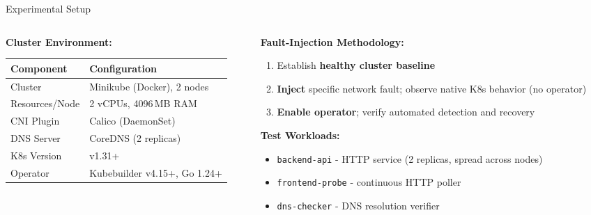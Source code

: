 \documentclass[aspectratio=169, 11pt]{beamer}
\begin{document}
\begin{frame}{Experimental Setup}

\begin{columns}[T]
\begin{column}{0.45\textwidth}
\footnotesize
\textbf{Cluster Environment:}
\vspace{4pt}
\renewcommand{\arraystretch}{1.15}
\setlength{\tabcolsep}{4pt}
\begin{tabular}{@{}l l@{}}
\toprule
\textbf{Component} & \textbf{Configuration} \\
\midrule
Cluster & Minikube (Docker), 2 nodes \\
Resources/Node & 2 vCPUs, 4096\,MB RAM \\
CNI Plugin & Calico (DaemonSet) \\
DNS Server & CoreDNS (2 replicas) \\
K8s Version & v1.31+ \\
Operator & Kubebuilder v4.15+, Go 1.24+ \\
\bottomrule
\end{tabular}
\end{column}

\begin{column}{0.52\textwidth}
\footnotesize
\textbf{Fault-Injection Methodology:}
\begin{enumerate}
  \item Establish \textbf{healthy cluster baseline}
  \item \textbf{Inject} specific network fault; observe native K8s behavior (no operator)
  \item \textbf{Enable operator}; verify automated detection and recovery
\end{enumerate}

\vspace{4pt}
\textbf{Test Workloads:}
\begin{itemize}
  \item \texttt{backend-api} - HTTP service (2 replicas, spread across nodes)
  \item \texttt{frontend-probe} - continuous HTTP poller
  \item \texttt{dns-checker} - DNS resolution verifier
\end{itemize}
\end{column}
\end{columns}

\end{frame}

\end{document}
